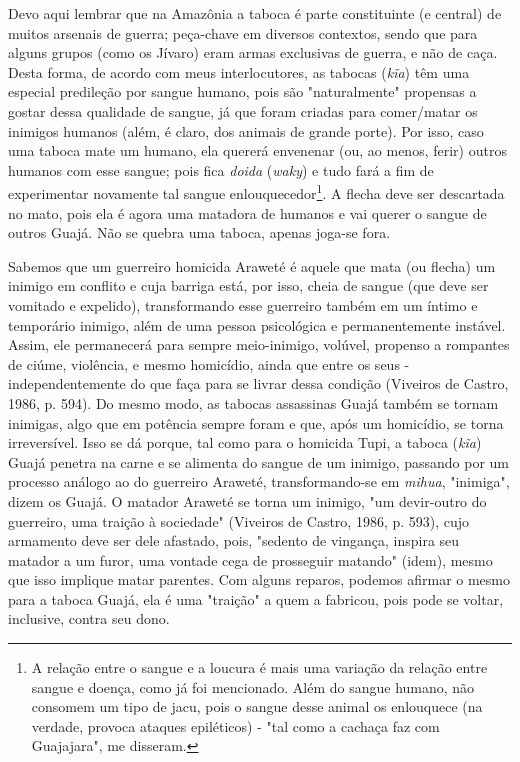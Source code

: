 Devo aqui lembrar que na Amazônia a taboca é parte constituinte (e
central) de muitos arsenais de guerra; peça-chave em diversos contextos,
sendo que para alguns grupos (como os Jívaro) eram armas exclusivas de
guerra, e não de caça. Desta forma, de acordo com meus interlocutores,
as tabocas (\emph{kĩa}) têm uma especial predileção por sangue humano,
pois são "naturalmente" propensas a gostar dessa qualidade de sangue, já
que foram criadas para comer/matar os inimigos humanos (além, é claro,
dos animais de grande porte). Por isso, caso uma taboca mate um humano,
ela quererá envenenar (ou, ao menos, ferir) outros humanos com esse
sangue; pois fica \emph{doida} (\emph{waky}) e tudo fará a fim de
experimentar novamente tal sangue enlouquecedor\footnote{A relação entre
  o sangue e a loucura é mais uma variação da relação entre sangue e
  doença, como já foi mencionado. Além do sangue humano, não consomem um
  tipo de jacu, pois o sangue desse animal os enlouquece (na verdade,
  provoca ataques epiléticos) - "tal como a cachaça faz com Guajajara",
  me disseram.}. A flecha deve ser descartada no mato, pois ela é agora
uma matadora de humanos e vai querer o sangue de outros Guajá. Não se
quebra uma taboca, apenas joga-se fora.

Sabemos que um guerreiro homicida Araweté é aquele que mata (ou flecha)
um inimigo em conflito e cuja barriga está, por isso, cheia de sangue
(que deve ser vomitado e expelido), transformando esse guerreiro também
em um íntimo e temporário inimigo, além de uma pessoa psicológica e
permanentemente instável. Assim, ele permanecerá para sempre
meio-inimigo, volúvel, propenso a rompantes de ciúme, violência, e mesmo
homicídio, ainda que entre os seus - independentemente do que faça para
se livrar dessa condição (Viveiros de Castro, 1986, p. 594). Do mesmo
modo, as tabocas assassinas Guajá também se tornam inimigas, algo que em
potência sempre foram e que, após um homicídio, se torna irreversível.
Isso se dá porque, tal como para o homicida Tupi, a taboca (\emph{kĩa})
Guajá penetra na carne e se alimenta do sangue de um inimigo, passando
por um processo análogo ao do guerreiro Araweté, transformando-se em
\emph{mihua}, "inimiga", dizem os Guajá. O matador Araweté se torna um
inimigo, "um devir-outro do guerreiro, uma traição à sociedade"
(Viveiros de Castro, 1986, p. 593), cujo armamento deve ser dele
afastado, pois, "sedento de vingança, inspira seu matador a um furor,
uma vontade cega de prosseguir matando" (idem), mesmo que isso implique
matar parentes. Com alguns reparos, podemos afirmar o mesmo para a
taboca Guajá, ela é uma "traição" a quem a fabricou, pois pode se
voltar, inclusive, contra seu dono.

